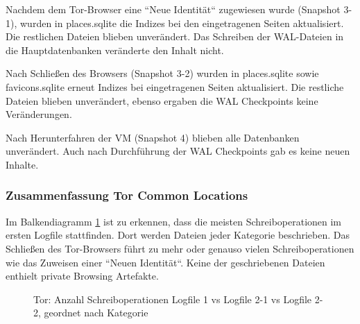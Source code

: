 \begin{appendices}
		Nachdem dem Tor-Browser eine ``Neue Identität`` zugewiesen wurde (Snapshot 3-1), wurden in places.sqlite die Indizes bei den eingetragenen Seiten aktualisiert. Die restlichen Dateien blieben unverändert. Das Schreiben der WAL-Dateien in die Hauptdatenbanken veränderte den Inhalt nicht.
		
		Nach Schließen des Browsers (Snapshot 3-2) wurden in places.sqlite sowie favicons.sqlite erneut Indizes bei eingetragenen Seiten aktualisiert. Die restliche Dateien blieben unverändert, ebenso ergaben die WAL Checkpoints keine Veränderungen.
		
		Nach Herunterfahren der VM (Snapshot 4) blieben alle Datenbanken unverändert. Auch nach Durchführung der WAL Checkpoints gab es keine neuen Inhalte.
		
		\subsubsection*{Zusammenfassung Tor Common Locations}
		Im Balkendiagramm \ref{chart:firefox-writefile-logfile1v21vs22} ist zu erkennen, dass die meisten Schreiboperationen im ersten Logfile stattfinden. Dort werden Dateien jeder Kategorie beschrieben. Das Schließen des Tor-Browsers führt zu mehr oder genauso vielen Schreiboperationen wie das Zuweisen einer ``Neuen Identität``. Keine der geschriebenen Dateien enthielt private Browsing Artefakte.
		\begin{figure}[h!]
			\caption{Tor: Anzahl Schreiboperationen Logfile 1 vs Logfile 2-1 vs Logfile 2-2, geordnet nach Kategorie}
			\label{chart:firefox-writefile-logfile1v21vs22}
		\end{figure}
		

\end{appendices}
